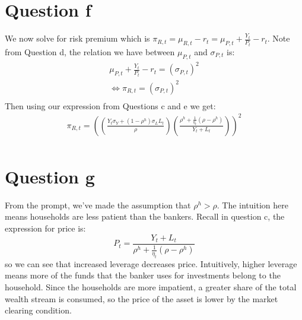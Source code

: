 \documentclass{article}
\begin{document}
\section*{Question f}
We now solve for risk premium which is $\pi_{R, t} = \mu_{R, t} - r_t = \mu_{P, t} + \frac{Y_t}{P_t} - r_t$. Note from Question d, the relation we have between $\mu_{P, t}$ and $\sigma_{P, t}$ is:
\[
    \begin{aligned}
        \mu_{P, t} + \frac{Y_t}{P_t} - r_t = (\sigma_{P, t})^2\\
        \iff \pi_{R, t} = (\sigma_{P, t})^2 \\
    \end{aligned}    
\]
Then using our expression from Questions c and e we get:
\[\begin{aligned}
    \boxed{\pi_{R, t} = \left(\left(\frac{Y_t \sigma_Y + (1 - \rho^h) \sigma_L L_t}{\rho}\right) \left(\frac{\rho^h + \frac{1}{\eta_t}(\rho-\rho^h)}{Y_{t} + L_t} \right)\right)^2} \\
\end{aligned}\]
\section*{Question g}
From the prompt, we've made the assumption that $\rho^{h}>\rho$. The intuition here means households are less patient than the bankers. Recall in question c, the expression for price is:
\[
    P_t = \frac{Y_{t} + L_t}{\rho^h + \frac{1}{\eta_t}(\rho-\rho^h)}    
\]
so we can see that increased leverage decreases price. Intuitively, higher leverage means more of the funds that the banker uses for investments belong to the household. Since the households are more impatient, a greater share of the total wealth stream is consumed, so the price of the asset is lower by the market clearing condition.
\end{document}

